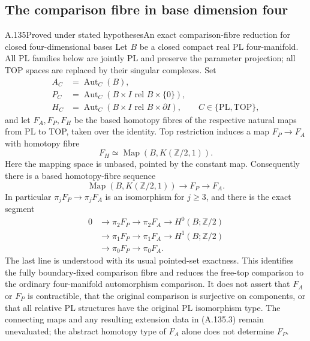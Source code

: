 \subsection{The comparison fibre in base dimension four}

\begin{saresult}{A.135}{Proved under stated hypotheses}{An exact comparison-fibre reduction for closed four-dimensional bases}
Let $B$ be a closed compact real PL four-manifold. All PL families below
are jointly PL and preserve the parameter projection; all TOP spaces
are replaced by their singular complexes. Set
\[
\begin{aligned}
 A_C&=\operatorname{Aut}_C(B),\\
 P_C&=\operatorname{Aut}_C(B\times I\text{ rel }B\times\{0\}),\\
 H_C&=\operatorname{Aut}_C(B\times I\text{ rel }B\times\partial I),
 \qquad C\in\{\mathrm{PL},\mathrm{TOP}\},
\end{aligned}
\]
and let $F_A,F_P,F_H$ be the based homotopy fibres of the respective
natural maps from PL to TOP, taken over the identity.
Top restriction induces a map $F_P\to F_A$ with homotopy fibre
\[
 F_H\simeq \operatorname{Map}(B,K(\mathbb Z/2,1)).
                                                        \tag{A.135.1}
\]
Here the mapping space is unbased, pointed by the constant map.
Consequently there is a based homotopy-fibre sequence
\[
 \operatorname{Map}(B,K(\mathbb Z/2,1))
 \longrightarrow F_P\longrightarrow F_A.                \tag{A.135.2}
\]
In particular $\pi_jF_P\to\pi_jF_A$ is an isomorphism for $j\ge3$,
and there is the exact segment
\[
\begin{aligned}
0&\longrightarrow\pi_2F_P\longrightarrow\pi_2F_A
\longrightarrow H^0(B;\mathbb Z/2)\\
 &\longrightarrow\pi_1F_P\longrightarrow\pi_1F_A
\longrightarrow H^1(B;\mathbb Z/2)\\
 &\longrightarrow\pi_0F_P\longrightarrow\pi_0F_A.
\end{aligned}                                           \tag{A.135.3}
\]
The last line is understood with its usual pointed-set exactness.
This identifies the fully boundary-fixed comparison fibre and reduces
the free-top comparison to the ordinary four-manifold automorphism
comparison. It does not assert that $F_A$ or $F_P$ is contractible,
that the original comparison is surjective on components, or that
all relative PL structures have the original PL isomorphism type.
The connecting maps and any resulting extension data in (A.135.3)
remain unevaluated; the abstract homotopy type of $F_A$ alone does
not determine $F_P$.
\end{saresult}
